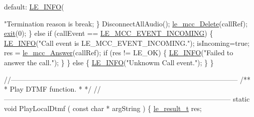 \begin{DoxyCodeInclude}
{{{{{{{{{{            \textcolor{keywordflow}{default}:
                \hyperlink{le__log_8h_a23e6d206faa64f612045d688cdde5808}{LE\_INFO}(\textcolor{stringliteral}{"Termination reason is %
                \textcolor{keywordflow}{break};
        \}
        DisconnectAllAudio();
        \hyperlink{le__mcc__interface_8h_a1a016e6443df2d3ee99113649f4f34ae}{le\_mcc\_Delete}(callRef);
        \hyperlink{app_stop_client_8c_a310220604a584e112ba8f7aa3dfe23f1}{exit}(0);
    \}
    \textcolor{keywordflow}{else} \textcolor{keywordflow}{if} (callEvent == \hyperlink{le__mcc__interface_8h_aefc4679ffa76d0e04c578572c22f06cfab37936f33d31259ea0c16169ba852bd0}{LE\_MCC\_EVENT\_INCOMING})
    \{
        \hyperlink{le__log_8h_a23e6d206faa64f612045d688cdde5808}{LE\_INFO}(\textcolor{stringliteral}{"Call event is LE\_MCC\_EVENT\_INCOMING."});
        isIncoming=\textcolor{keyword}{true};
        res = \hyperlink{le__mcc__interface_8h_a598349c6ccfa151dbd1d2f2a9c293ca4}{le\_mcc\_Answer}(callRef);
        \textcolor{keywordflow}{if} (res != LE\_OK)
        \{
            \hyperlink{le__log_8h_a23e6d206faa64f612045d688cdde5808}{LE\_INFO}(\textcolor{stringliteral}{"Failed to answer the call."});
        \}
    \}
    \textcolor{keywordflow}{else}
    \{
        \hyperlink{le__log_8h_a23e6d206faa64f612045d688cdde5808}{LE\_INFO}(\textcolor{stringliteral}{"Unknowm Call event."});
    \}
\}

\textcolor{comment}{//--------------------------------------------------------------------------------------------------}\textcolor{comment}{}
\textcolor{comment}{/**}
\textcolor{comment}{ * Play DTMF function.}
\textcolor{comment}{ *}
\textcolor{comment}{ */}
\textcolor{comment}{//--------------------------------------------------------------------------------------------------}
\textcolor{keyword}{static} \textcolor{keywordtype}{void} PlayLocalDtmf
(
    \textcolor{keyword}{const} \textcolor{keywordtype}{char} * argString
)
\{
    \hyperlink{le__basics_8h_a1cca095ed6ebab24b57a636382a6c86c}{le\_result\_t} res;

}}}}}}}}}}}
\end{DoxyCodeInclude}
